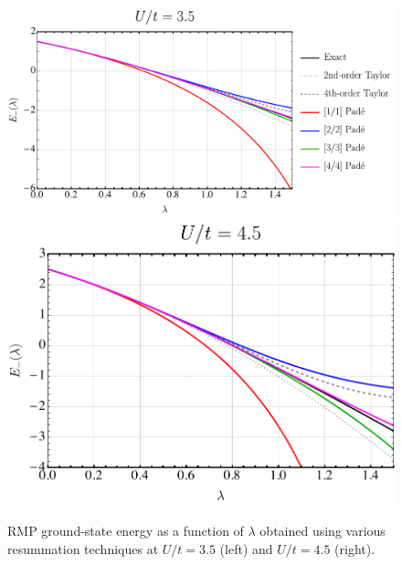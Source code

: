 \documentclass[aps,prb,reprint,noshowkeys,superscriptaddress]{revtex4-1}
\begin{document}
\begin{figure}
    \includegraphics[height=0.23\textheight]{PadeRMP35}
    \includegraphics[height=0.23\textheight]{PadeRMP45}
    \caption{\label{fig:PadeRMP}
    RMP ground-state energy as a function of $\lambda$ obtained using various resummation techniques at $U/t = 3.5$ (left) and $U/t = 4.5$ (right).}
\end{figure}

\end{document}
